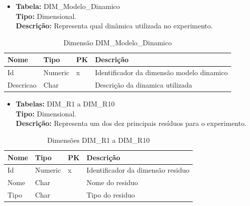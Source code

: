 
\begin{itemize}
	\item
		\textbf{Tabela:} DIM\_Modelo\_Dinamico \\
		\textbf{Tipo:} Dimensional. \\
		\textbf{Descrição:} Representa qual dinâmica utilizada no experimento. \\
\end{itemize}
\begin{table}[!htbp]
	\caption{Dimensão DIM\_Modelo\_Dinamico}
	\centering
	\begin{tabular}{@{}llll@{}}
	\toprule
	\textbf{Nome} 	& \textbf{Tipo} & \textbf{PK} & \textbf{Descrição}           			\\ \midrule
	Id            	& Numeric           & x           & Identificador da dimensão modelo dinamico   \\
	Descricao     	& Char       &             & Descrição da dinamica utilizada        \\ \bottomrule
	\end{tabular}
\end{table}


\begin{itemize}
	\item
		\textbf{Tabelas:} DIM\_R1 a DIM\_R10 \\
		\textbf{Tipo:} Dimensional. \\
		\textbf{Descrição:} Representa um dos dez principais resíduos para o experimento. \\
\end{itemize}
\begin{table}[!htbp]
	\caption{Dimensões DIM\_R1 a DIM\_R10}
	\centering
	\begin{tabular}{@{}llll@{}}
	\toprule
	\textbf{Nome} 	& \textbf{Tipo} & \textbf{PK} & \textbf{Descrição}           		\\ \midrule
	Id            	& Numeric           & x           & Identificador da dimensão residuo   \\
	Nome 		  & Char       &             & Nome do residuo 					   	\\ 
	Tipo          & Char       &             & Tipo do residuo           	   		\\ \bottomrule   
	\end{tabular}
\end{table}
	

